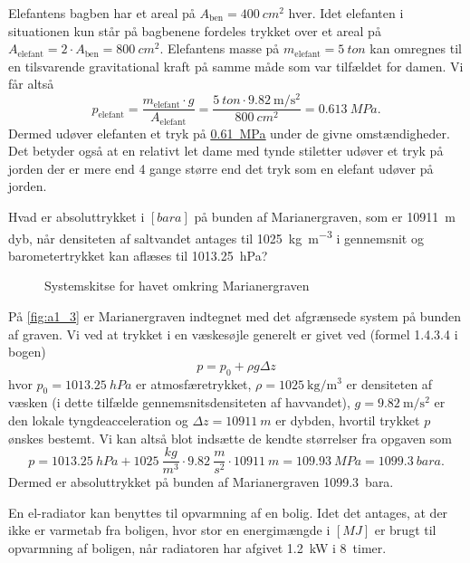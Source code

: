 \documentclass[a4paper]{article}
\begin{document}
Elefantens bagben har et areal på $A_{\mathrm{ben}} = \qty{400}{cm^2}$ hver. Idet elefanten i situationen kun står på bagbenene fordeles trykket over et areal på $A_{\mathrm{elefant}} = 2 \cdot A_{\mathrm{ben}} = \qty{800}{cm^2}$. Elefantens masse på $m_{\mathrm{elefant}} = \qty{5}{ton}$ kan omregnes til en tilsvarende gravitational kraft på samme måde som var tilfældet for damen. Vi får altså
\[ 
p_{\mathrm{elefant}} = \frac{m_{\mathrm{elefant}} \cdot g}{A_{\mathrm{elefant}}} = \frac{\qty{5}{ton} \cdot \qty{9.82}{\meter\per\square\second}}{\qty{800}{cm^2}} = \qty{0,613}{MPa}
.\]
Dermed udøver elefanten et tryk på \underline{\underline{\qty{0,61}{MPa}}} under de givne omstændigheder. Det betyder også at en relativt let dame med tynde stiletter udøver et tryk på jorden der er mere end 4 gange større end det tryk som en elefant udøver på jorden.

\clearpage

Hvad er absoluttrykket i $[\unit{bara}]$ på bunden af Marianergraven, som er \qty{10911}{m} dyb, når densiteten af saltvandet antages til \qty{1025}{\kilogram\per\cubic\meter} i gennemsnit og barometertrykket kan aflæses til \qty{1013,25}{hPa}?

\begin{figure}[ht]
    \centering
    \caption{Systemskitse for havet omkring Marianergraven}
    \label{fig:a1_3}
\end{figure}
På \autoref{fig:a1_3} er Marianergraven indtegnet med det afgrænsede system på bunden af graven. Vi ved at trykket i en væskesøjle generelt er givet ved (formel 1.4.3.4 i bogen)
\[ 
p = p_0 + \rho g \Delta z
\]
hvor $p_0 = \qty{1013,25}{hPa}$ er atmosfæretrykket, $\rho = \qty{1025}{\kilogram\per\cubic\meter}$ er densiteten af væsken (i dette tilfælde gennemsnitsdensiteten af havvandet), $g = \qty{9,82}{\meter\per\square\second}$ er den lokale tyngdeacceleration og $\Delta z = \qty{10911}{m}$ er dybden, hvortil trykket $p$ ønskes bestemt. Vi kan altså blot indsætte de kendte størrelser fra opgaven som
\[ 
p = \qty{1013,25}{hPa} + \qty{1025}{\frac{kg}{m^3}} \cdot \qty{9,82}{\frac{m}{s^2}} \cdot \qty{10911}{m} = \qty{109,93}{MPa} = \qty{1099,3}{bara} 
.\]
Dermed er absoluttrykket på bunden af Marianergraven \qty{1099,3}{bara}.

\clearpage

En el-radiator kan benyttes til opvarmning af en bolig. Idet det antages, at der ikke er varmetab fra boligen, hvor stor en energimængde i $[\unit{MJ}]$ er brugt til opvarmning af boligen, når radiatoren har afgivet \qty{1,2}{kW} i \qty{8}{timer}.
\end{document}
